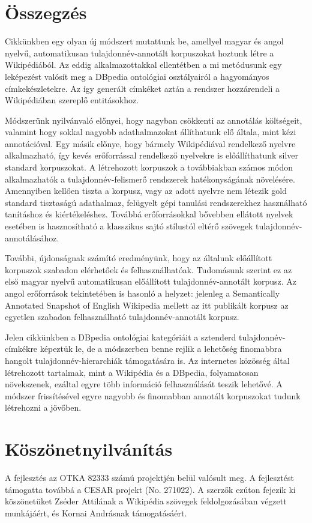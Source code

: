 \documentclass{llncs}
\begin{document}
\section{Összegzés}
\label{conc}

Cikkünkben egy olyan új módszert mutattunk be, amellyel magyar és angol nyelvű, automatikusan tulajdonnév-annotált korpuszokat hoztunk létre a Wikipédiából. Az eddig alkalmazottakkal ellentétben a mi metódusunk egy leképezést valósít meg a DBpedia ontológiai osztályairól a hagyományos címkekészletekre. Az így generált címkéket aztán a rendszer hozzárendeli a Wikipédiában szereplő entitásokhoz. 

Módszerünk nyilvánvaló előnyei, hogy nagyban csökkenti az annotálás költségeit, valamint hogy sokkal nagyobb adathalmazokat állíthatunk elő általa, mint kézi annotációval. Egy másik előnye, hogy bármely Wikipédiával rendelkező nyelvre alkalmazható, így kevés erőforrással rendelkező nyelvekre is előállíthatunk silver standard korpuszokat. A létrehozott korpuszok a továbbiakban számos módon alkalmazhatók a tulajdonnév-felismerő rendszerek hatékonyságának növelésére. Amennyiben kellően tiszta a korpusz, vagy az adott nyelvre nem létezik gold standard tisztaságú adathalmaz, felügyelt gépi tanulási rendszerekhez használható tanításhoz és kiértékeléshez. Továbbá erőforrásokkal bővebben ellátott nyelvek esetében is hasznosítható a klasszikus sajtó stílustól eltérő szövegek tulajdonnév-annotálásához. 

További, újdonságnak számító eredményünk, hogy az általunk előállított korpuszok szabadon elérhetőek és felhasználhatóak. Tudomásunk szerint ez az első magyar nyelvű automatikusan előállított tulajdonnév-annotált korpusz. Az angol erőforrások tekintetében is hasonló a helyzet: jelenleg a Semantically Annotated Snapshot of English Wikipedia mellett az itt publikált korpusz az egyetlen szabadon felhasználható tulajdonnév-annotált korpusz. 

Jelen cikkünkben a DBpedia ontológiai kategóriáit a sztenderd tulajdonnév-címkékre képeztük le, de a módszerben benne rejlik a lehetőség finomabbra hangolt tulajdonnév-hierarchiák támogatására is. Az internetes közösség által létrehozott tartalmak, mint a Wikipédia és a DBpedia, folyamatosan növekszenek, ezáltal egyre több információ felhasználását teszik lehetővé. A módszer frissítésével egyre nagyobb és finomabban annotált korpuszokat tudunk létrehozni a jövőben.  

\section*{Köszönetnyilvánítás}
A fejlesztés az OTKA 82333 számú projektjén belül valósult meg. A fejlesztést támogatta továbbá a CESAR projekt (No. 271022). A szerzők ezúton fejezik ki köszönetüket Zséder Attilának a Wikipédia szövegek feldolgozásában végzett munkájáért, és Kornai Andrásnak támogatásáért. %



\end{document}
